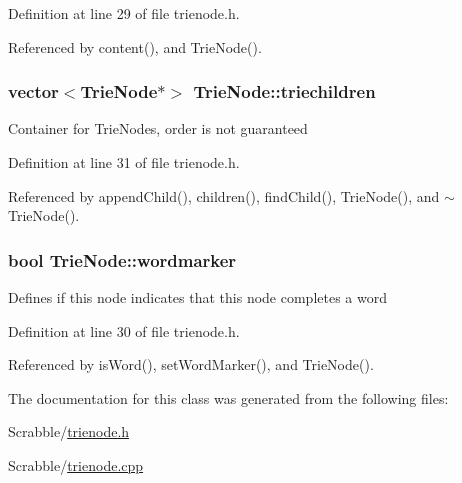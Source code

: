 Definition at line 29 of file trienode.\-h.



Referenced by content(), and Trie\-Node().

\hypertarget{class_trie_node_ab3c2858f5075f4c36ec613592ab20cea}{
\subsubsection[{triechildren}]{\setlength{\rightskip}{0pt plus 5cm}vector$<${\bf Trie\-Node}$\ast$$>$ Trie\-Node\-::triechildren\hspace{0.3cm}{\ttfamily [private]}}}\label{class_trie_node_ab3c2858f5075f4c36ec613592ab20cea}
Container for Trie\-Nodes, order is not guaranteed 

Definition at line 31 of file trienode.\-h.



Referenced by append\-Child(), children(), find\-Child(), Trie\-Node(), and $\sim$\-Trie\-Node().

\hypertarget{class_trie_node_acbd36bc970f70dcbde62e63211daa8d7}{
\subsubsection[{wordmarker}]{\setlength{\rightskip}{0pt plus 5cm}bool Trie\-Node\-::wordmarker\hspace{0.3cm}{\ttfamily [private]}}}\label{class_trie_node_acbd36bc970f70dcbde62e63211daa8d7}
Defines if this node indicates that this node completes a word 

Definition at line 30 of file trienode.\-h.



Referenced by is\-Word(), set\-Word\-Marker(), and Trie\-Node().



The documentation for this class was generated from the following files\-:\begin{DoxyCompactItemize}
\item 
Scrabble/\hyperlink{trienode_8h}{trienode.\-h}\item 
Scrabble/\hyperlink{trienode_8cpp}{trienode.\-cpp}\end{DoxyCompactItemize}
